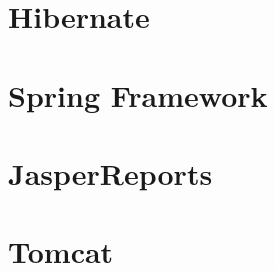\section{Hibernate}
\label{sec:embasamentoTeoricoHibernate}


\section{Spring Framework}
\label{sec:embasamentoTeoricoSpring}

\section{JasperReports}
\label{sec:embasamentoTeoricoJasper}

\section{Tomcat}
\label{sec:embasamentoTeoricoTomcat}

